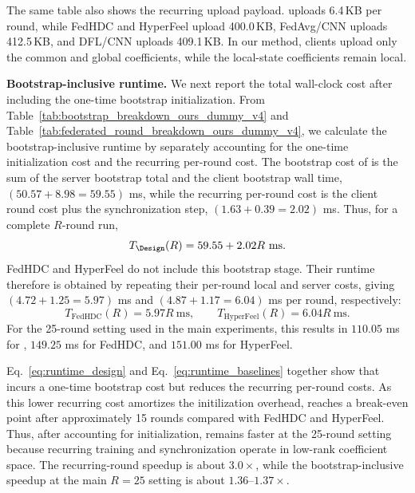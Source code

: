 \documentclass[lettersize,journal]{IEEEtran}
\newcommand{\rev}[1]{#1}
\begin{document}
The same table also shows the recurring upload payload.
\Design uploads 6.4\,KB per round, while FedHDC and HyperFeel upload 400.0\,KB, FedAvg/CNN uploads 412.5\,KB, and DFL/CNN uploads 409.1\,KB.
In our method, clients upload only the common and global coefficients, while the \rev{local-state coefficients remain local}.


\noindent\rev{\textbf{Bootstrap-inclusive runtime.}} \rev{We next report the total wall-clock cost after including the one-time bootstrap initialization. From Table~\ref{tab:bootstrap_breakdown_ours_dummy_v4} and Table~\ref{tab:federated_round_breakdown_ours_dummy_v4}, we calculate the bootstrap-inclusive runtime by separately accounting for the one-time initialization cost and the recurring per-round cost.
The bootstrap cost of \Design is the sum of the server bootstrap total and the client bootstrap wall time, $(50.57+8.98=59.55)$ ms, while the recurring per-round cost is the client round cost plus the synchronization step, $(1.63+0.39=2.02)$ ms.}
\rev{Thus, for a complete \(R\)-round run,}
\begin{equation}
\label{eq:runtime_design}
\rev{T_{\Design}(R)=59.55+2.02R~\mathrm{ms}.}
\end{equation}
\rev{FedHDC and HyperFeel do not include this bootstrap stage. Their runtime therefore is obtained by repeating their per-round local and server costs, giving $(4.72+1.25=5.97)$ ms and $(4.87+1.17=6.04)$ ms per round, respectively:}
\begin{equation}
\label{eq:runtime_baselines}
\rev{T_{\mathrm{FedHDC}}(R)=5.97R~\mathrm{ms}, \qquad}
\rev{T_{\mathrm{HyperFeel}}(R)=6.04R~\mathrm{ms}.}
\end{equation}
\rev{For the 25-round setting used in the main experiments, this results in \(110.05\) ms for \Design, \(149.25\) ms for FedHDC, and \(151.00\) ms for HyperFeel.}

\rev{Eq.~\ref{eq:runtime_design} and Eq.~\ref{eq:runtime_baselines} together show that \Design incurs a one-time bootstrap cost but reduces the recurring per-round costs.
As this lower recurring cost amortizes the initilization overhead, \Design reaches a break-even point after approximately 15 rounds compared with FedHDC and HyperFeel.}
\rev{Thus, after accounting for initialization, \Design remains faster at  the 25-round setting because recurring training and synchronization operate in low-rank coefficient space.}
\rev{The recurring-round speedup is about \(3.0\times\), while the bootstrap-inclusive speedup at the main \(R=25\) setting is about \(1.36\)--\(1.37\times\).}
\end{document}
